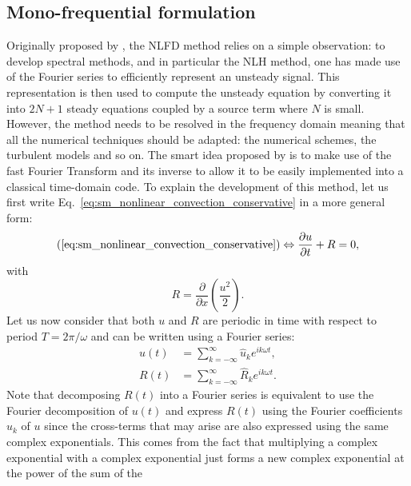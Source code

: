 
\subsection{Mono-frequential formulation}

Originally proposed by \citet{McMullen2001}, the NLFD
method relies on a simple observation: to develop spectral methods, and in
particular the NLH method, one has made use of the Fourier
series to efficiently represent an unsteady signal.
This representation is then used to compute the unsteady
equation by converting it into $2N+1$ steady equations coupled by a 
source term where $N$ is small.
However, the method needs to be resolved in the frequency domain meaning
that all the numerical techniques should be adapted: the numerical schemes,
the turbulent models and so on. The smart idea 
proposed by \citet{McMullen2001} is to
make use of the fast Fourier Transform and its inverse to
allow it to be easily implemented into a classical time-domain code.
To explain the development of this method, let us first 
write Eq.~\eqref{eq:sm_nonlinear_convection_conservative} 
in a more general form:
\begin{equation}
	(\ref{eq:sm_nonlinear_convection_conservative})
	\Leftrightarrow
	\frac{\partial u}{\partial t} + R = 0,
	\label{eq:sm_nonlinear_convection_residual}
\end{equation}
with
\begin{equation}
	R = \frac{\partial}{\partial x} \left( 
	\frac{u^2}{2} \right).
\end{equation}
Let us now consider that both $u$ and $R$ are periodic
in time with respect to period $T = 2 \pi / \omega$
and can be written using a Fourier series:
\begin{equation}
	\begin{split}
		u(t) &= \sum_{k=-\infty}^{\infty} \widehat{u}_k e^{i k \omega t}, \\
		R(t) &= \sum_{k=-\infty}^{\infty} \widehat{R}_k e^{i k \omega t}.
	\end{split}
\end{equation}
Note that decomposing $R(t)$ into a Fourier series is equivalent
to use the Fourier decomposition of $u(t)$ and express
$R(t)$ using the Fourier coefficients $\widehat{u}_k$ of $u$
since the cross-terms that may arise are also expressed 
using the same complex exponentials. This comes from the fact
that multiplying a complex exponential with a complex exponential
just forms a new complex exponential at the power of the sum of the
